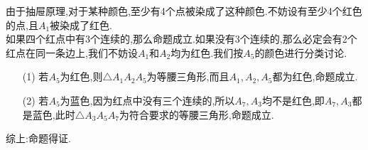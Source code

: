 \documentclass[UTF8]{ctexart}
\begin{document}
\hspace*{2em}由于抽屉原理,对于某种颜色,至少有4个点被染成了这种颜色.不妨设有至少4个红色的点,且$A_1$被染成了红色.\\
\hspace*{2em}如果四个红点中有3个连续的,那么命题成立.如果没有3个连续的,那么必定会有2个红点在同一条边上,我们不妨设$A_1$和$A_2$均为红色.我们按$A_5$的颜色进行分类讨论.\\
\begin{itemize}
	\item[(1)]若$ A_5 $为红色,则$\bigtriangleup A_1A_2A_5$为等腰三角形,而且$ A_1,A_2,A_5 $都为红色,命题成立.
	\item[(2)]若$ A_5 $为蓝色,因为红点中没有三个连续的,所以$ A_7,A_3 $均不是红色,即$ A_7,A_3 $都是蓝色,此时$ \bigtriangleup A_3A_5A_7 $为符合要求的等腰三角形,命题成立.
\end{itemize}
综上:命题得证.
\end{document}
